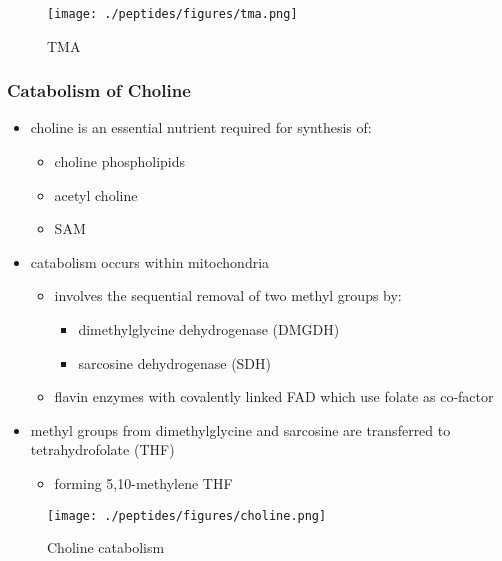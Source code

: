 \documentclass{scrartcl}
\begin{document}
\begin{figure}[htbp]
\centering
\texttt{[image: ./peptides/figures/tma.png]}
\caption{\label{fig:orgb8e4ec1}
TMA}
\end{figure}

\subsubsection{Catabolism of Choline}
\label{sec:org2564d02}
\begin{itemize}
\item choline is an essential nutrient required for synthesis of:
\begin{itemize}
\item choline phospholipids
\item acetyl choline
\item SAM
\end{itemize}
\item catabolism occurs within mitochondria
\begin{itemize}
\item involves the sequential removal of two methyl groups by:
\begin{itemize}
\item dimethylglycine dehydrogenase (DMGDH)
\item sarcosine dehydrogenase (SDH)
\end{itemize}
\item flavin enzymes with covalently linked FAD which use folate as co-factor
\end{itemize}
\item methyl groups from dimethylglycine and sarcosine are transferred to
tetrahydrofolate (THF)
\begin{itemize}
\item forming 5,10-methylene THF
\end{itemize}
\end{itemize}

\begin{figure}[htbp]
\centering
\texttt{[image: ./peptides/figures/choline.png]}
\caption{\label{fig:org868c033}
Choline catabolism}
\end{figure}
\end{document}
